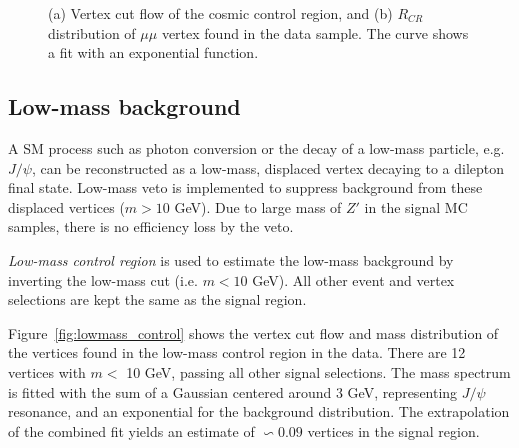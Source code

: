 \begin{figure}[!htb]
    \centering
    \caption{(a) Vertex cut flow of the cosmic control region, and (b) $R_{CR}$ distribution of $\mu\mu$ vertex found in the data sample. The curve shows a fit with an exponential function.}
    \label{fig:cosmic_control}
\end{figure}


\subsection{Low-mass background}
\label{sec:low_mass}
A SM process such as photon conversion or the decay of a low-mass particle, e.g. $J/\psi$, can be reconstructed as a low-mass, displaced vertex decaying to a dilepton final state. Low-mass veto is implemented to suppress background from these displaced vertices ($m > 10$ GeV). Due to large mass of $Z'$ in the signal MC samples, there is no efficiency loss by the veto.

\textit{Low-mass control region} is used to estimate the low-mass background by inverting the low-mass cut (i.e. $m < 10$ GeV). All other event and vertex selections are kept the same as the signal region. 

Figure~\ref{fig:lowmass_control} shows the vertex cut flow and mass distribution of the vertices found in the low-mass control region in the data. There are 12 vertices with $m < $ 10 GeV, passing all other signal selections. The mass spectrum is fitted with the sum of a Gaussian centered around $3$ GeV, representing $J/\psi$ resonance, and an exponential for the background distribution. The extrapolation of the combined fit yields an estimate of $\backsim 0.09$ vertices in the signal region.



